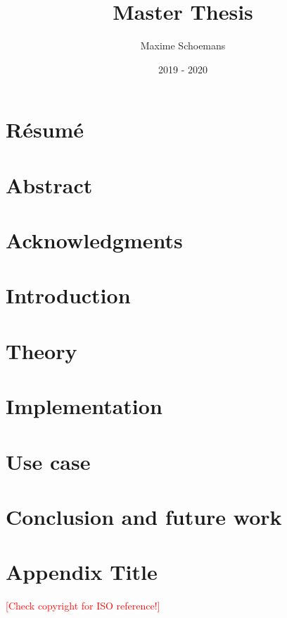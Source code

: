 \documentclass[12pt, twoside]{report}
\title{Master Thesis}
\author{Maxime Schoemans}
\date{2019 - 2020}
\newcommand{\note}[1]{\textcolor{red}{[#1]}}
\begin{document}


\chapter*{Résumé}


\chapter*{Abstract}

 
\chapter*{Acknowledgments}

 
\tableofcontents

\listoffigures

\listoftables

\chapter{Introduction}

 
\chapter{Theory}

 
\chapter{Implementation}

 
\chapter{Use case}

 
\chapter{Conclusion and future work}


\appendix

\chapter{Appendix Title}


\nocite{*}
\printbibliography
\note{Check copyright for ISO reference!}
\end{document}
